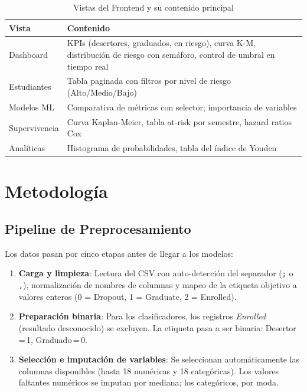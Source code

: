 \documentclass[12pt]{article}
\begin{document}
{\begin{table}[H]
\centering
\caption{Vistas del Frontend y su contenido principal}
\label{tab:vistas}
\begin{tabular}{p{3cm}p{10cm}}
\toprule
\textbf{Vista} & \textbf{Contenido} \\
\midrule
Dashboard & KPIs (desertores, graduados, en riesgo), curva K-M, distribución de riesgo con semáforo, control de umbral en tiempo real \\
Estudiantes & Tabla paginada con filtros por nivel de riesgo (Alto/Medio/Bajo) \\
Modelos ML & Comparativa de métricas con selector; importancia de variables \\
Supervivencia & Curva Kaplan-Meier, tabla at-risk por semestre, hazard ratios Cox \\
Analíticas & Histograma de probabilidades, tabla del índice de Youden \\
\bottomrule
\end{tabular}
\end{table}

\section{Metodología}

\subsection{Pipeline de Preprocesamiento}
\label{sec:smote}

Los datos pasan por cinco etapas antes de llegar a los modelos:

\begin{enumerate}[label=\textbf{E\arabic*.}]
    \item \textbf{Carga y limpieza}: Lectura del CSV con auto-detección del separador
    (\texttt{;} o \texttt{,}), normalización de nombres de columnas y mapeo de la
    etiqueta objetivo a valores enteros (0 = Dropout, 1 = Graduate, 2 = Enrolled).

    \item \textbf{Preparación binaria}: Para los clasificadores, los registros
    \textit{Enrolled} (resultado desconocido) se excluyen. La etiqueta pasa a ser
    binaria: Desertor\,=\,1, Graduado\,=\,0.

    \item \textbf{Selección e imputación de variables}: Se seleccionan automáticamente
    las columnas disponibles (hasta 18 numéricas y 18 categóricas). Los valores
    faltantes numéricos se imputan por mediana; los categóricos, por moda.


\end{enumerate}}
\end{document}
